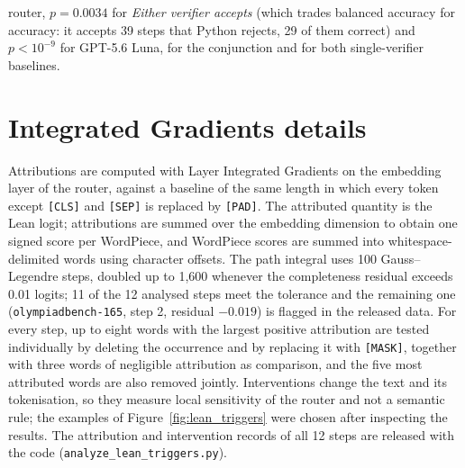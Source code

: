 router, $p=0.0034$ for \emph{Either verifier accepts} (which trades balanced accuracy for accuracy: it accepts 39 steps that Python rejects, 29 of them correct) and $p<10^{-9}$ for GPT-5.6 Luna, for the conjunction and for both single-verifier baselines.



\section{Integrated Gradients details}
\label{app:ig}
Attributions are computed with Layer Integrated Gradients \cite{sundararajan2017axiomatic} on the embedding layer of the router, against a baseline of the same length in which every token except \texttt{[CLS]} and \texttt{[SEP]} is replaced by \texttt{[PAD]}. The attributed quantity is the Lean logit; attributions are summed over the embedding dimension to obtain one signed score per WordPiece, and WordPiece scores are summed into whitespace-delimited words using character offsets. The path integral uses 100 Gauss--Legendre steps, doubled up to 1,600 whenever the completeness residual exceeds 0.01 logits; 11 of the 12 analysed steps meet the tolerance and the remaining one (\texttt{olympiadbench-165}, step 2, residual $-0.019$) is flagged in the released data. For every step, up to eight words with the largest positive attribution are tested individually by deleting the occurrence and by replacing it with \texttt{[MASK]}, together with three words of negligible attribution as comparison, and the five most attributed words are also removed jointly. Interventions change the text and its tokenisation, so they measure local sensitivity of the router and not a semantic rule; the examples of Figure~\ref{fig:lean_triggers} were chosen after inspecting the results. The attribution and intervention records of all 12 steps are released with the code (\texttt{analyze\_lean\_triggers.py}).

